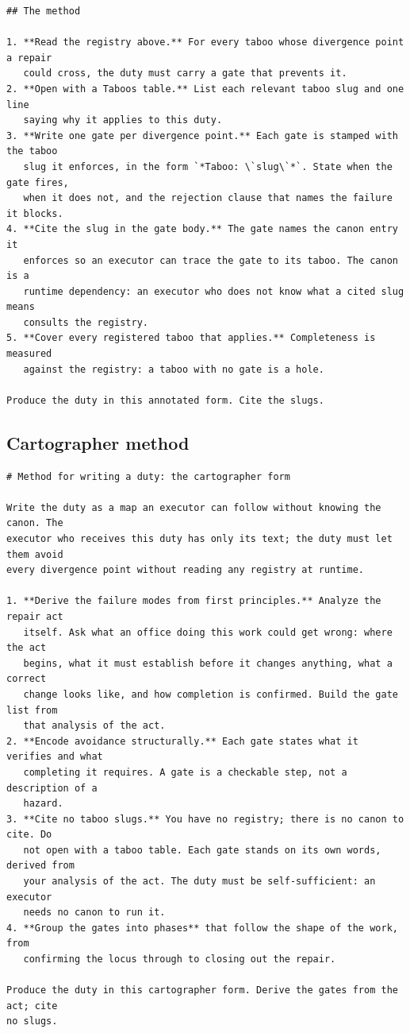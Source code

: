 \documentclass[11pt,a4paper]{article}
\begin{document}
\begin{footnotesize}
\begin{verbatim}
## The method

1. **Read the registry above.** For every taboo whose divergence point a repair
   could cross, the duty must carry a gate that prevents it.
2. **Open with a Taboos table.** List each relevant taboo slug and one line
   saying why it applies to this duty.
3. **Write one gate per divergence point.** Each gate is stamped with the taboo
   slug it enforces, in the form `*Taboo: \`slug\`*`. State when the gate fires,
   when it does not, and the rejection clause that names the failure it blocks.
4. **Cite the slug in the gate body.** The gate names the canon entry it
   enforces so an executor can trace the gate to its taboo. The canon is a
   runtime dependency: an executor who does not know what a cited slug means
   consults the registry.
5. **Cover every registered taboo that applies.** Completeness is measured
   against the registry: a taboo with no gate is a hole.

Produce the duty in this annotated form. Cite the slugs.
\end{verbatim}
\end{footnotesize}

\subsection{Cartographer method}
\begin{footnotesize}
\begin{verbatim}
# Method for writing a duty: the cartographer form

Write the duty as a map an executor can follow without knowing the canon. The
executor who receives this duty has only its text; the duty must let them avoid
every divergence point without reading any registry at runtime.

1. **Derive the failure modes from first principles.** Analyze the repair act
   itself. Ask what an office doing this work could get wrong: where the act
   begins, what it must establish before it changes anything, what a correct
   change looks like, and how completion is confirmed. Build the gate list from
   that analysis of the act.
2. **Encode avoidance structurally.** Each gate states what it verifies and what
   completing it requires. A gate is a checkable step, not a description of a
   hazard.
3. **Cite no taboo slugs.** You have no registry; there is no canon to cite. Do
   not open with a taboo table. Each gate stands on its own words, derived from
   your analysis of the act. The duty must be self-sufficient: an executor
   needs no canon to run it.
4. **Group the gates into phases** that follow the shape of the work, from
   confirming the locus through to closing out the repair.

Produce the duty in this cartographer form. Derive the gates from the act; cite
no slugs.
\end{verbatim}
\end{footnotesize}
\end{document}
